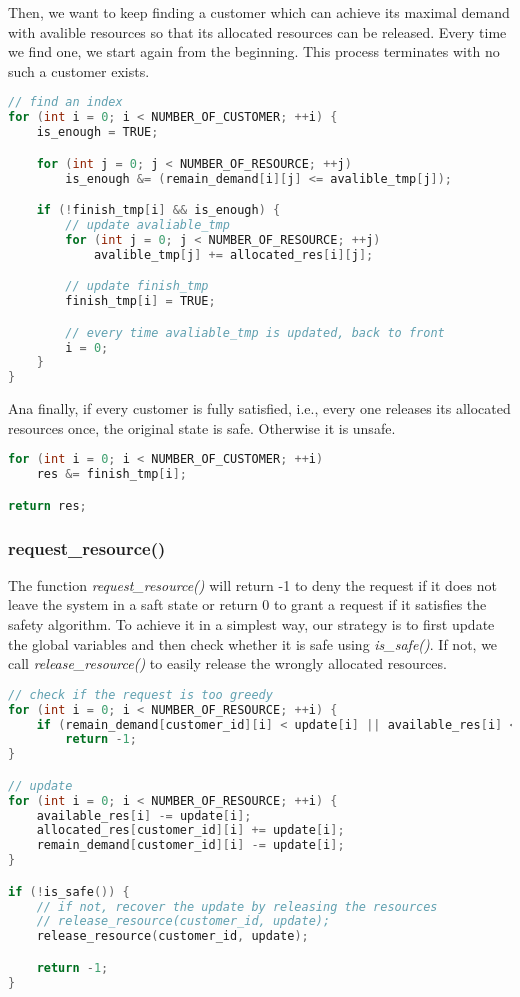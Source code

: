 \documentclass{article}
\begin{document}
Then, we want to keep finding a customer which can achieve its maximal demand with avalible resources so that its allocated resources can be released. Every time we find one, we start again from the beginning. This process terminates with no such a customer exists. 

\begin{lstlisting}[language=c, caption={is\_safe() II}]
// find an index
for (int i = 0; i < NUMBER_OF_CUSTOMER; ++i) {
    is_enough = TRUE;

    for (int j = 0; j < NUMBER_OF_RESOURCE; ++j)
        is_enough &= (remain_demand[i][j] <= avalible_tmp[j]);

    if (!finish_tmp[i] && is_enough) {
        // update avaliable_tmp
        for (int j = 0; j < NUMBER_OF_RESOURCE; ++j) 
            avalible_tmp[j] += allocated_res[i][j];

        // update finish_tmp
        finish_tmp[i] = TRUE;

        // every time avaliable_tmp is updated, back to front
        i = 0;
    }
}
\end{lstlisting}

Ana finally, if every customer is fully satisfied, i.e., every one releases its allocated resources once, the original state is safe. Otherwise it is unsafe.

\begin{lstlisting}[language=c, caption={is\_safe() III}]
for (int i = 0; i < NUMBER_OF_CUSTOMER; ++i) 
    res &= finish_tmp[i];

return res;
\end{lstlisting}

\subsubsection*{request\_resource()}
The function \textit{request\_resource()} will return -1 to deny the request if it does not leave the system in a saft state or return 0 to grant a request if it satisfies the safety algorithm. To achieve it in a simplest way, our strategy is to first update the global variables and then check whether it is safe using \textit{is\_safe()}. If not, we call \textit{release\_resource()} to easily release the wrongly allocated resources.

\begin{lstlisting}[language=c, caption={request\_resource() I}]
// check if the request is too greedy
for (int i = 0; i < NUMBER_OF_RESOURCE; ++i) {
    if (remain_demand[customer_id][i] < update[i] || available_res[i] < update[i])
        return -1;
}

// update
for (int i = 0; i < NUMBER_OF_RESOURCE; ++i) {
    available_res[i] -= update[i];
    allocated_res[customer_id][i] += update[i];
    remain_demand[customer_id][i] -= update[i];
}

if (!is_safe()) {
    // if not, recover the update by releasing the resources
    // release_resource(customer_id, update);
    release_resource(customer_id, update);

    return -1;
}
\end{lstlisting}
\end{document}

